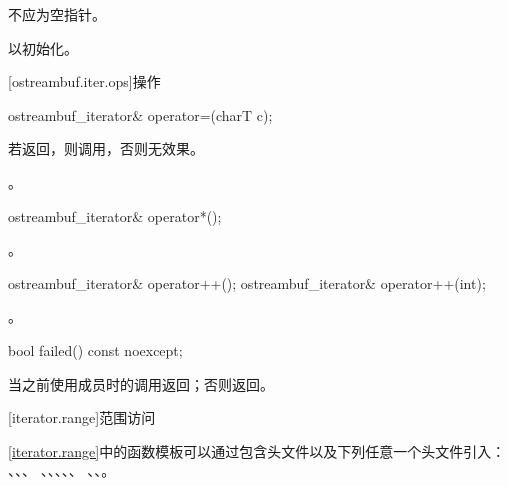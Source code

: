 \begin{itemdescr}
\pnum
\requires
{}不应为空指针。

\pnum
\effects
以初始化。
\end{itemdescr}

[ostreambuf.iter.ops]{操作}

%
\begin{itemdecl}
ostreambuf_iterator& operator=(charT c);
\end{itemdecl}

\begin{itemdescr}
\pnum
\effects
若返回，则调用，否则无效果。

\pnum
\returns
{}。
\end{itemdescr}

%
\begin{itemdecl}
ostreambuf_iterator& operator*();
\end{itemdecl}

\begin{itemdescr}
\pnum
\returns
{}。
\end{itemdescr}

%
\begin{itemdecl}
ostreambuf_iterator& operator++();
ostreambuf_iterator& operator++(int);
\end{itemdecl}

\begin{itemdescr}
\pnum
\returns
{}。
\end{itemdescr}

%
\begin{itemdecl}
bool failed() const noexcept;
\end{itemdecl}

\begin{itemdescr}
\pnum
\returns
{}当之前使用成员时的调用返回；否则返回。
\end{itemdescr}

[iterator.range]{范围访问}

\pnum
\ref{iterator.range}中的函数模板可以通过包含头文件以及下列任意一个头文件引入：
、、、
、、、、、
、、。

